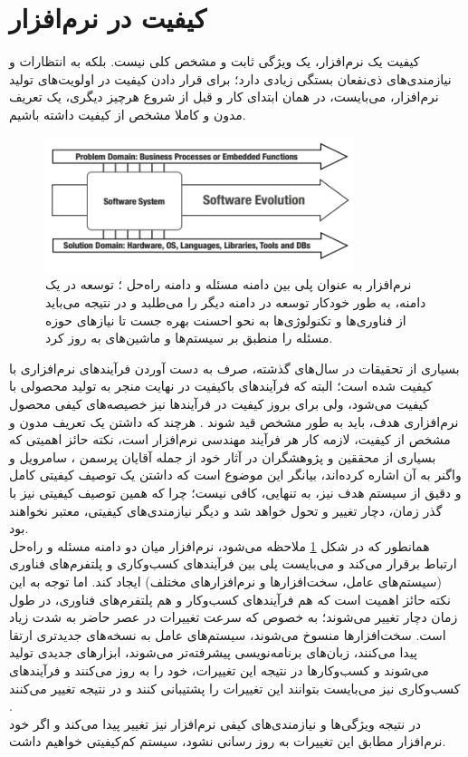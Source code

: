 \section{کیفیت در نرم‌افزار}
کیفیت یک نرم‌افزار، یک ویژگی ثابت و مشخص کلی نیست. بلکه به انتظارات و نیازمندی‌های ذی‌نفعان بستگی زیادی دارد؛ برای قرار دادن کیفیت در اولویت‌های تولید نرم‌افزار، می‌بایست، در همان ابتدای کار و قبل از شروع هرچیز دیگری، یک تعریف مدون و کاملا مشخص از کیفیت داشته باشیم.\\
\begin{figure}[H]
	\centering\includegraphics[width=9cm]{Resources/mediator.PNG}
	\caption[نرم‌افزار به عنوان پلی بین دامنه مسئله و دامنه راه‌حل]
	{نرم‌افزار به عنوان پلی بین دامنه مسئله و دامنه راه‌حل
		\cite{wagner_software_2013}؛
		توسعه در یک دامنه، به طور خودکار توسعه در دامنه دیگر را می‌طلبد و در نتیجه می‌باید از فناوری‌ها و تکنولوژی‌ها به نحو احسنت بهره جست تا نیازهای حوزه مسئله را منطبق بر سیستم‌ها و ماشین‌های به روز کرد.
	}
	\label{fig:mediator}
\end{figure}
بسیاری از تحقیقات در سال‌های گذشته، صرف به دست آوردن فرآیندهای نرم‌افزاری با کیفیت شده است؛ البته که فرآیندهای باکیفیت در نهایت منجر به تولید محصولی با کیفیت می‌شود، ولی برای بروز کیفیت در فرآیندها نیز خصیصه‌های کیفی
محصول نرم‌افزاری هدف، باید به طور مشخص قید شوند
\cite{sommerville_software_2016}.
هرچند که داشتن یک تعریف مدون و مشخص از کیفیت، لازمه کار هر فرآیند مهندسی نرم‌افزار است، نکته حائز اهمیتی که بسیاری از محققین و پژوهشگران در آثار خود از جمله آقایان پرسمن
\cite{pressman_software_2015}،
سامرویل
\cite{sommerville_software_2016}
و واگنر
\cite{wagner_software_2013}
به آن اشاره کرده‌اند، بیانگر این موضوع است که داشتن یک توصیف کیفیتی  کامل و دقیق از سیستم هدف نیز، به تنهایی، کافی نیست؛ چرا که همین توصیف کیفیتی نیز با گذر زمان، دچار تغییر و تحول خواهد شد و دیگر نیازمندی‌های کیفیتی، معتبر نخواهند بود.\\
همانطور که در شکل
\ref{fig:mediator}
ملاحظه می‌شود، نرم‌افزار میان دو دامنه مسئله و راه‌حل ارتباط برقرار می‌کند و می‌بایست پلی بین فرآیند‌های کسب‌وکاری و پلتفرم‌های فناوری (سیستم‌های عامل، سخت‌افزارها و نرم‌افزارهای مختلف) ایجاد کند. اما توجه به این نکته حائز اهمیت است که هم فرآیندهای کسب‌وکار و هم پلتفرم‌های فناوری، در طول زمان دچار تغییر می‌شوند؛ به خصوص که سرعت تغییرات در عصر حاضر به شدت زیاد است. سخت‌افزارها منسوخ می‌شوند، سیستم‌های عامل به نسخه‌های جدیدتری ارتقا پیدا می‌کنند، زبان‌های برنامه‌نویسی پیشرفته‌تر می‌شوند، ابزارهای جدیدی تولید می‌شوند و کسب‌وکارها در نتیجه این تغییرات، خود را به روز می‌کنند و فرآیندهای کسب‌وکاری نیز می‌بایست بتوانند این تغییرات را پشتیبانی کنند و در نتیجه تغییر می‌کنند
\cite{wagner_software_2013}.\\
در نتیجه ویژگی‌ها و نیازمندی‌های کیفی نرم‌افزار نیز تغییر پیدا می‌کند و اگر خود نرم‌افزار مطابق این تغییرات به روز رسانی نشود، سیستم کم‌کیفیتی خواهیم داشت.
